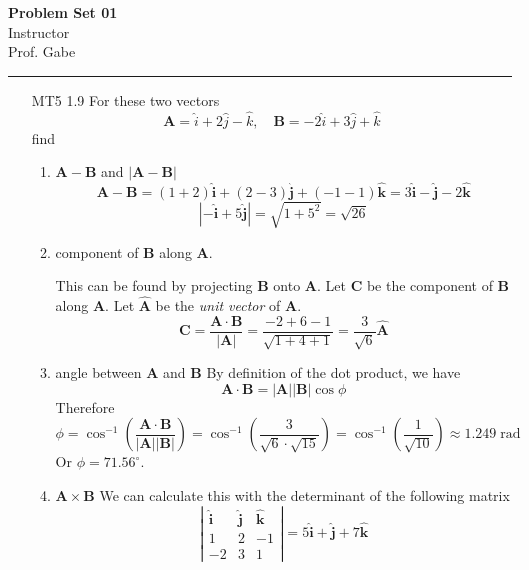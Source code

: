 \documentclass[12pt]{article}
\newcommand{\paren}[1]{\left( #1 \right)}
\newcommand{\abso}[1]{\left|#1 \right|}
\newcommand{\uni}{\hat{\mathbf{i}}}
\newcommand{\unj}{\hat{\mathbf{j}}}
\newcommand{\unk}{\hat{\mathbf{k}}}
\newif\ifshow
\begin{document}
\begin{center}
\ifshow
  \textbf{\Large Problem Set 01 Solution}\\
\else
  \textbf{\Large Problem Set 01}\\
\fi
Instructor \\ Prof. Gabe\\
\end{center}

\hrule

\vspace{0.2cm}



\begin{enumerate}
    \item[MT5 1.9] For these two vectors
\[
\mathbf{A} = \hat{i} + 2\hat{j} - \hat{k}, \quad \mathbf{B} = -2\hat{i} + 3\hat{j} + \hat{k}
\]
find
\begin{enumerate}
    \item \(\mathbf{A} - \mathbf{B}\) and \(|\mathbf{A} - \mathbf{B}|\)
    \[
    \mathbf{A} - \mathbf{B} = (1+2)\uni + (2-3)\unj + (-1-1)\unk = 3\uni - \unj - 2\unk
    \]
    \[
    \abso{-\uni + 5 \unj} = \sqrt{1+5^2} = \sqrt{26}
    \]
    \item component of \(\mathbf{B}\) along \(\mathbf{A}\).
    
    This can be found by projecting \textbf{B} onto \textbf{A}. Let \textbf{C} be the component of \textbf{B} along \textbf{A}. Let $\hat{\mathbf{A}}$ be the \textit{unit vector} of \textbf{A}.
    \[
    \mathbf{C} = \frac{\mathbf{A}\cdot \mathbf{B}}{\abso{\mathbf{A}}} = \frac{-2+6-1}{\sqrt{1+4+1}} = \frac{3}{\sqrt{6}}\hat{\mathbf{A}}
    \]
    
    \item angle between \(\mathbf{A}\) and \(\mathbf{B}\)
    By definition of the dot product, we have
    \[
    \mathbf{A}\cdot \mathbf{B} = \abso{\mathbf{A}}\abso{\mathbf{B}}\cos\phi
    \]
    Therefore
    \[
    \phi = \cos^{-1}\paren{\frac{\mathbf{A}\cdot \mathbf{B}}{\abso{\mathbf{A}}\abso{\mathbf{B}}}} = \cos^{-1}\paren{\frac{3}{\sqrt{6}\cdot \sqrt{15}}} = \cos^{-1}\paren{\frac{1}{\sqrt{10}}} \approx 1.249 \; \text{rad}
    \]
    Or $\phi = 71.56^\circ$.
    
    \item \(\mathbf{A} \times \mathbf{B}\)
    We can calculate this with the determinant of the following matrix
    \[
    \abso{
    \begin{matrix}
        \uni & \unj & \unk\\
        1 & 2 & -1\\
        -2& 3 & 1
    \end{matrix}
    } = 5\uni + \unj + 7\unk 
    \]
    

\end{enumerate}
\end{enumerate}
\end{document}
